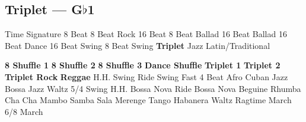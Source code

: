 \subsection{Triplet --- \UiKey{\II}\UiKey{\MET}G$\flat$1}
Time Signature
8 Beat
8 Beat Rock
16 Beat
8 Beat Ballad
16 Beat Ballad
16 Beat Dance
16 Beat Swing
8 Beat Swing
\textbf{Triplet}
Jazz
Latin/Traditional





























\textbf{8 Shuffle 1}
\textbf{8 Shuffle 2}
\textbf{8 Shuffle 3}
\textbf{Dance Shuffle}
\textbf{Triplet 1}
\textbf{Triplet 2}
\textbf{Triplet Rock}
\textbf{Reggae}
H.H. Swing
Ride Swing
Fast 4 Beat
Afro Cuban
Jazz Bossa
Jazz Waltz
5/4 Swing
H.H. Bossa Nova
Ride Bossa Nova
Beguine
Rhumba
Cha Cha
Mambo
Samba
Sala
Merenge
Tango
Habanera
Waltz
Ragtime
March
6/8 March
